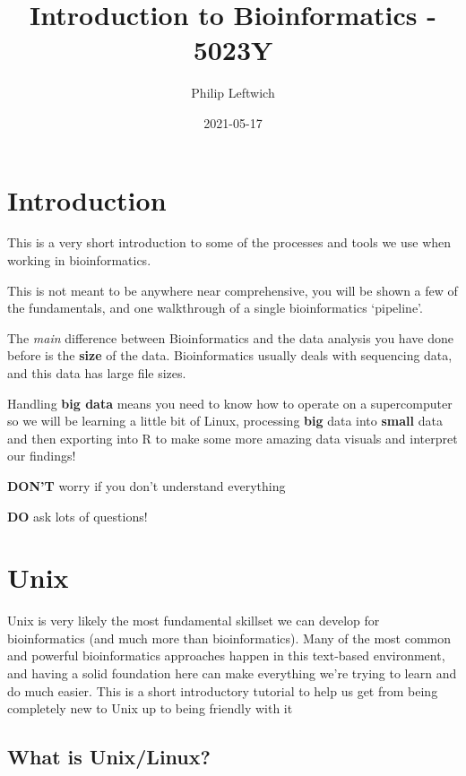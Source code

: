 \documentclass[
]{book}
\title{Introduction to Bioinformatics - 5023Y}
\author{Philip Leftwich}
\date{2021-05-17}
\begin{document}
\maketitle

{
\setcounter{tocdepth}{1}
\tableofcontents
}
\hypertarget{introduction}{%
\chapter{Introduction}\label{introduction}}

This is a very short introduction to some of the processes and tools we use when working in bioinformatics.

This is not meant to be anywhere near comprehensive, you will be shown a few of the fundamentals, and one walkthrough of a single bioinformatics `pipeline'.

The \emph{main} difference between Bioinformatics and the data analysis you have done before is the \textbf{size} of the data. Bioinformatics usually deals with sequencing data, and this data has large file sizes.

Handling \textbf{big data} means you need to know how to operate on a supercomputer so we will be learning a little bit of Linux, processing \textbf{big} data into \textbf{small} data and then exporting into R to make some more amazing data visuals and interpret our findings!

\textbf{DON'T} worry if you don't understand everything

\textbf{DO} ask lots of questions!

\hypertarget{Unix}{%
\chapter{Unix}\label{Unix}}

Unix is very likely the most fundamental skillset we can develop for bioinformatics (and much more than bioinformatics). Many of the most common and powerful bioinformatics approaches happen in this text-based environment, and having a solid foundation here can make everything we're trying to learn and do much easier. This is a short introductory tutorial to help us get from being completely new to Unix up to being friendly with it 🙂

\hypertarget{what-is-unixlinux}{%
\section{What is Unix/Linux?}\label{what-is-unixlinux}}
\end{document}
